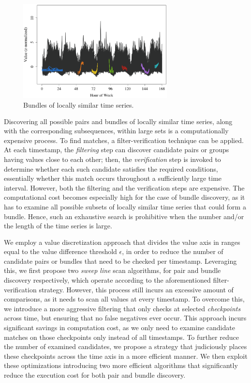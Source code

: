 \begin{figure}[!tb]
    \centering
    \includegraphics[width=0.7\textwidth]{figures/bundles_water.png}
    \caption{Bundles of locally similar time series.}
    \label{fig:bundles_water}
\end{figure}

Discovering all possible pairs and bundles of locally similar time series, along with the corresponding subsequences, within large sets is a computationally expensive process. To find matches, a filter-verification technique can be applied. At each timestamp, the {\em filtering} step can discover candidate pairs or groups having values close to each other; then, the {\em verification} step is invoked to determine whether each such candidate satisfies the required conditions, essentially whether this match occurs throughout a sufficiently large time interval. However, both the filtering and the verification steps are expensive. The computational cost becomes especially high for the case of bundle discovery, as it has to examine all possible subsets of locally similar time series that could form a bundle. Hence, such an exhaustive search is prohibitive when the number and/or the length of the time series is large.

We employ a value discretization approach that divides the value axis in ranges equal to the value difference threshold $\epsilon$, in order to reduce the number of candidate pairs or bundles that need to be checked per timestamp. Leveraging this, we first propose two \textit{sweep line} scan algorithms, for pair and bundle discovery respectively, which operate according to the aforementioned filter-verification strategy. However, this process still incurs an excessive amount of comparisons, as it needs to scan all values at every timestamp. To overcome this, we introduce a more aggressive filtering  that only checks at selected \textit{checkpoints} across time, but ensuring that no false negatives ever occur. This approach incurs significant savings in computation cost, as we only need to examine candidate matches on those checkpoints only instead of all timestamps. To further reduce the number of examined candidates, we propose a strategy that judiciously places these checkpoints across the time axis in a more efficient manner. We then exploit these optimizations introducing two more efficient algorithms that significantly reduce the execution cost for both pair and bundle discovery.

